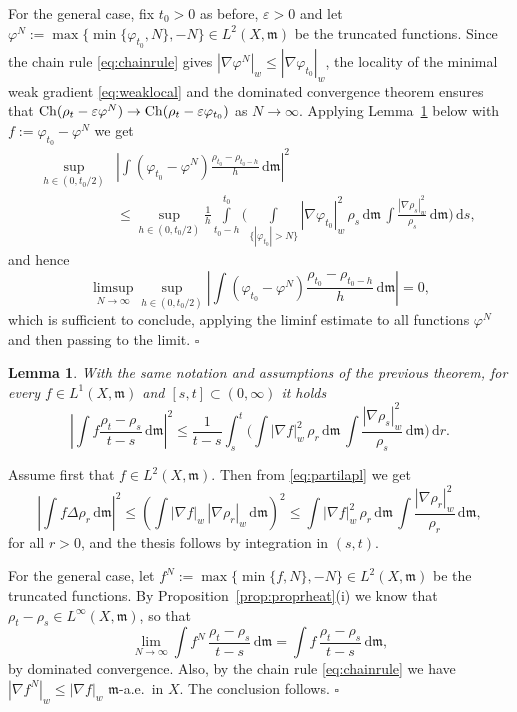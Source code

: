 \documentclass[reqno,11pt]{article}
\numberwithin{equation}{section}
\newcommand{\C}{\mathbb{C}}
\newcommand{\mm}{{\mbox{\boldmath$m$}}}
\renewcommand{\d}{{\mathrm d}}
\newcommand{\eps}{\varepsilon}
\newenvironment{proof}{\removelastskip\par\medskip   %
\noindent{\em Proof.}
\rm}{\penalty-20\null\hfill$\square$\par\medbreak}
\newtheorem{lemma}[theorem]{Lemma}
\newcommand{\weakgrad}[1]{|\nabla #1|_w}                %
\renewcommand{\C}{{\rm Ch}}
\newcommand{\Deltam}{\Delta}
\renewcommand{\mm}{\mathfrak m}
\begin{document}
\begin{proof}
For the general case, fix $t_0>0$ as before, $\eps>0$ and let
$\varphi^N:=\max\{\min\{\varphi_{t_0},N\},-N\}\in L^2(X,\mm)$ be the
truncated functions. Since the chain rule \eqref{eq:chainrule} gives
$\weakgrad{\varphi^N}\leq\weakgrad{\varphi_{t_0}}$, the locality of
the minimal weak gradient \eqref{eq:weaklocal} and the dominated
convergence theorem ensures that $\C(\rho_t-\eps \varphi^N)\to
\C(\rho_t-\eps \varphi_{t_0})$ as $N\to\infty$. Applying
Lemma~\ref{le:luigi} below with $f:=\varphi_{t_0}-\varphi^N$ we get
\[
\begin{split}
\sup_{h\in(0,t_0/2)}&\left|\int
(\varphi_{t_0}-\varphi^N)\frac{\rho_{t_0}-\rho_{t_0-h}}{h}\,\d\mm\right|^2\\
&\leq \sup_{h\in(0,t_0/2)}\frac1h\int\limits_{t_0-h}^{t_0}
\biggl(\int\limits_{\{|\varphi_{t_0}|>N\}}\weakgrad
{\varphi_{t_0}}^2\,\rho_s\,\d\mm\,\int\frac{\weakgrad{\rho_s}^2}{\rho_s}\,\d\mm\biggr)\,\d
s,
\end{split}
\]
and hence
\[
\limsup_{N\to\infty}\sup_{h\in(0,t_0/2)}\left|\int
(\varphi_{t_0}-\varphi^N)\frac{
\rho_{t_0}-\rho_{t_0-h}}{h}\,\d\mm\right|=0,
\]
which is sufficient to conclude, applying the liminf estimate to all
functions $\varphi^N$ and then passing to the limit.
\end{proof}

\begin{lemma}\label{le:luigi} With the same notation and assumptions
of the previous theorem, for every $f\in L^1(X,\mm)$ and
$[s, t]\subset (0,\infty)$ it holds
\begin{equation}
\label{eq:trucco} \left|\int
f\frac{\rho_{t}-\rho_s}{t-s}\,\d\mm\right|^2\leq
\frac1{t-s}\int_s^{t}\biggl(\int\weakgrad
f^2\,\rho_r\,\d\mm\,\int\frac{\weakgrad{\rho_s}^2}{\rho_s}\,\d\mm\biggr)\,\d r.
\end{equation}
\end{lemma}
\begin{proof}
Assume first that $f\in L^2(X,\mm)$. Then from \eqref{eq:partilapl}
we get
\[
\left|\int f\Deltam\rho_r\,\d\mm\right|^2\leq\left(\int\weakgrad
f\,\weakgrad{\rho_r}\,\d\mm\right)^2\leq\int\weakgrad
f^2\,\rho_r\,\d\mm\,\int\frac{\weakgrad{\rho_r}^2}{\rho_r}\,\d\mm,
\]
for all $r>0$, and the thesis follows by integration in $(s,t)$.

For the general case, let $f^N:=\max\{\min\{f,N\},-N\}\in
L^2(X,\mm)$ be the truncated functions. By
Proposition~\ref{prop:proprheat}(i) we know that
$\rho_{t}-\rho_s\in L^\infty(X,\mm)$, so that
\[
\lim_{N\to\infty}\int f^N\,\frac{\rho_t-\rho_s}{t-s}\,\d\mm=\int
f\,\frac{\rho_t-\rho_s}{t-s}\,\d\mm,
\]
by dominated convergence. Also, by the chain rule
\eqref{eq:chainrule} we have $\weakgrad{f^N}\leq\weakgrad{f}$
$\mm$-a.e.~in $X$. The conclusion follows.
\end{proof}
\end{document}
